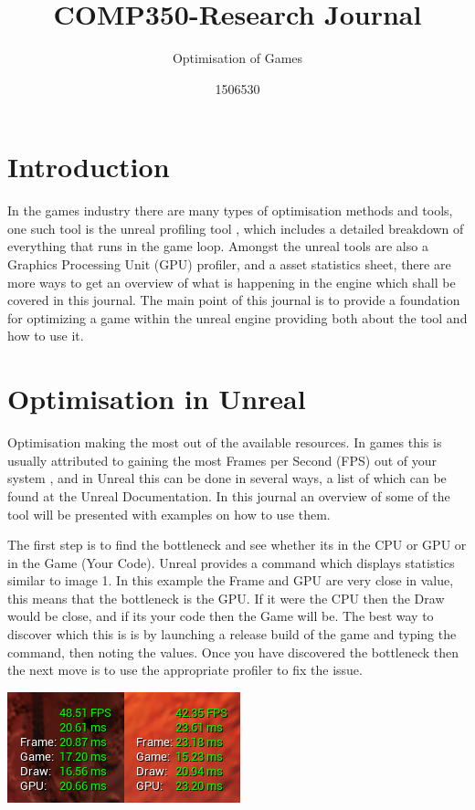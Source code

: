 \documentclass{scrartcl}
\title{COMP350-Research Journal}
\subtitle{Optimisation of Games}
\author{1506530}
\begin{document}
	
	
	\maketitle
\section{Introduction}
	In the games industry there are many types of optimisation methods and tools, one such tool is the unreal profiling tool \cite{UEPer}, which includes a detailed breakdown of everything that runs in the game loop. Amongst the unreal tools are also a Graphics Processing Unit (GPU) profiler, and a asset statistics sheet, there are more ways to get an overview of what is happening in the engine which shall be covered in this journal. The main point of this journal is to provide a foundation for optimizing a game within the unreal engine providing both about the tool and how to use it.
	
\section{Optimisation in Unreal}
Optimisation making the most out of the available resources. In games this is usually attributed to gaining the most Frames per Second (FPS) out of your system \cite{UEYouTube}, and in Unreal this can be done in several ways, a list of which can be found at the Unreal Documentation. In this journal an overview of some of the tool will be presented with examples on how to use them.

The first step is to find the bottleneck and see whether its in the CPU or GPU or in the Game (Your Code). Unreal provides a command  which displays statistics similar to image 1. In this example the Frame and GPU are very close in value, this means that the bottleneck is the GPU. If it were the CPU then the Draw would be close, and if its your code then the Game will be. The best way to discover which this is is by launching a release build of the game and typing the command, then noting the values. Once you have discovered the bottleneck then the next move is to use the appropriate profiler to fix the issue.

\includegraphics{Image1}
\end{document}
